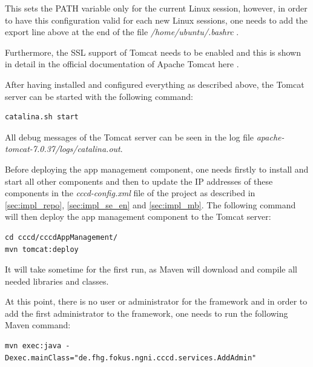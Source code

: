 \begin{itemize}
This sets the PATH variable only for the current Linux session, however, in order to have this configuration valid for each new Linux sessions, one needs to add the export line above at the end of the file \textit{/home/ubuntu/.bashrc} .

Furthermore, the SSL support of Tomcat needs to be enabled and this is shown in detail in the official documentation of Apache Tomcat here \cite{tomcat_ssl}.

\end{itemize}

After having installed and configured everything as described above, the Tomcat server can be started with the following command:
\begin{code}
\begin{verbatim}
catalina.sh start
\end{verbatim}
\end{code} 

All debug messages of the Tomcat server can be seen in the log file \textit{apache-tomcat-7.0.37/logs/catalina.out}. 

Before deploying the app management component, one needs firstly to install and start all other components and then to update the IP addresses of these components in the \textit{cccd-config.xml} file of the project as described in \ref{sec:impl_repo}, \ref{sec:impl_se_en} and \ref{sec:impl_mb}. The following command will then deploy the app management component to the Tomcat server:
\begin{code}
\begin{verbatim}
cd cccd/cccdAppManagement/
mvn tomcat:deploy
\end{verbatim}
\end{code}

It will take sometime for the first run, as Maven will download and compile all needed libraries and classes.

At this point, there is no user or administrator for the framework and in order to add the first administrator to the framework, one needs to run the following Maven command:

\begin{code}
\begin{verbatim}
mvn exec:java -Dexec.mainClass="de.fhg.fokus.ngni.cccd.services.AddAdmin"
\end{verbatim}
\end{code}

